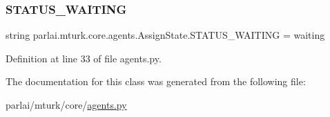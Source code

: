 \subsubsection{\texorpdfstring{S\+T\+A\+T\+U\+S\+\_\+\+W\+A\+I\+T\+I\+NG}{STATUS\_WAITING}}
{\footnotesize\ttfamily string parlai.\+mturk.\+core.\+agents.\+Assign\+State.\+S\+T\+A\+T\+U\+S\+\_\+\+W\+A\+I\+T\+I\+NG = \textquotesingle{}waiting\textquotesingle{}\hspace{0.3cm}{\ttfamily [static]}}



Definition at line 33 of file agents.\+py.



The documentation for this class was generated from the following file\+:\begin{DoxyCompactItemize}
\item 
parlai/mturk/core/\hyperlink{parlai_2mturk_2core_2agents_8py}{agents.\+py}\end{DoxyCompactItemize}

